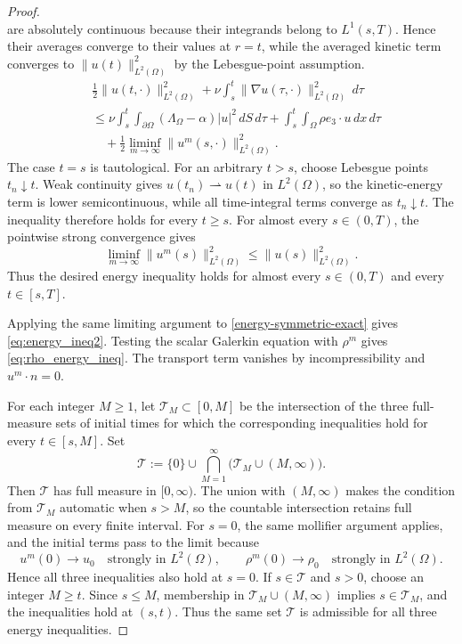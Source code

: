 \documentclass[11pt,reqno]{amsart}
\theoremstyle{plain}
\numberwithin{equation}{section}
\begin{document}
\begin{proof}
\[\]
are absolutely continuous because their integrands belong
to \(L^1(s,T)\). Hence their averages converge to their values at
\(r=t\), while the averaged kinetic term converges to
\(\|u(t)\|_{L^2(\Omega)}^2\) by the Lebesgue-point assumption.
    \begin{equation}
    \begin{split}
         &\frac{1}{2}\|u(t,\cdot)\|^2_{L^2(\Omega)}+\nu\int_s^t\|\nabla u(\tau,\cdot)\|^2_{L^2(\Omega)}\,d\tau
         \\&\le \nu\int_s^t \int_{\partial\Omega}(\Lambda_\Omega-\alpha)|u|^2\,dS\,d\tau+\int_s^t \int_\Omega \rho e_3\cdot u\,dx\,d\tau\\
         &\quad+\frac{1}{2}\liminf_{m\rightarrow \infty}\|u^m(s,\cdot)\|^2_{L^2(\Omega)}.
    \end{split}
    \end{equation}
    The case $t=s$ is tautological. For an arbitrary $t>s$, choose Lebesgue
    points $t_n\downarrow t$. Weak continuity gives
    $u(t_n)\rightharpoonup u(t)$ in $L^2(\Omega)$, so the kinetic-energy term
    is lower semicontinuous, while all time-integral terms converge as
    $t_n\downarrow t$. The inequality therefore holds for every $t\ge s$.
    For almost every $s\in(0,T)$, the pointwise strong convergence gives
    \[
    \liminf_{m\to\infty}\|u^m(s)\|_{L^2(\Omega)}^2
    \le \|u(s)\|_{L^2(\Omega)}^2.
    \]
    Thus the desired energy inequality holds for almost every $s\in(0,T)$ and every $t\in[s,T]$.
    
    Applying the same limiting argument to \eqref{energy-symmetric-exact} gives \eqref{eq:energy_ineq2}. Testing the scalar Galerkin equation with $\rho^m$ gives \eqref{eq:rho_energy_ineq}. The transport term vanishes by incompressibility and $u^m\cdot n=0$.

    For each integer $M\ge1$, let $\mathcal T_M\subset[0,M]$ be the intersection of the three full-measure sets of initial times for which the corresponding inequalities hold for every $t\in[s,M]$. Set
    \[
    \mathcal T
    :=\{0\}\cup\bigcap_{M=1}^{\infty}\bigl(\mathcal T_M\cup(M,\infty)\bigr).
    \]
    Then $\mathcal T$ has full measure in $[0,\infty)$. The union with $(M,\infty)$ makes the condition from $\mathcal T_M$ automatic when $s>M$, so the countable intersection retains full measure on every finite interval. For $s=0$, the same mollifier argument applies, and the initial terms
    pass to the limit because
    \[
    u^m(0)\to u_0 \quad\text{strongly in }L^2(\Omega),
    \qquad
    \rho^m(0)\to \rho_0 \quad\text{strongly in }L^2(\Omega).
    \]
    Hence all three inequalities also hold at $s=0$.
    {If \(s\in\mathcal T\) and \(s>0\), choose an integer \(M\ge t\). Since
    \(s\le M\), membership in
    \(\mathcal T_M\cup(M,\infty)\) implies \(s\in\mathcal T_M\), and the
    inequalities hold at \((s,t)\).} Thus the same
    set $\mathcal T$ is admissible for all three energy inequalities.
\end{proof}
\end{document}
